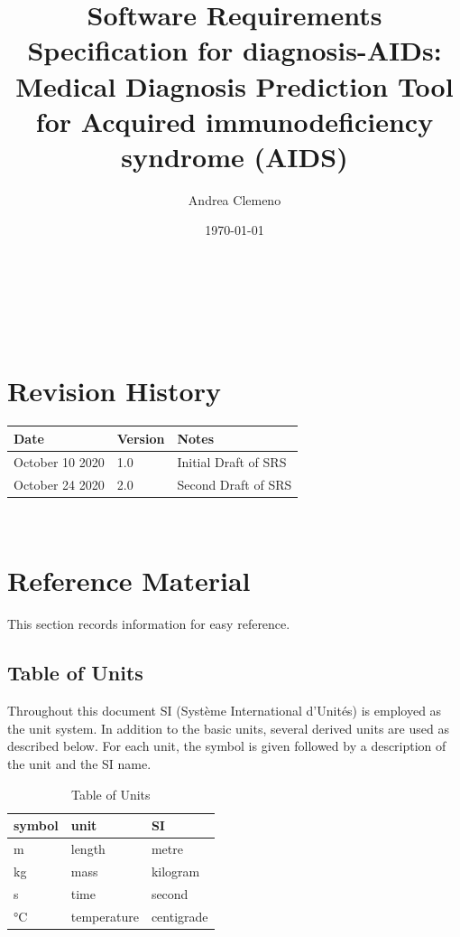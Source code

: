\documentclass[12pt]{article}
\begin{document}
\title{Software Requirements Specification for diagnosis-AIDs\progname: Medical 
Diagnosis Prediction Tool for Acquired immunodeficiency syndrome (AIDS)} 
\author{Andrea Clemeno}
\date{\today}
\maketitle	

~\newpage


\tableofcontents

~\newpage

\section*{Revision History}

\begin{tabularx}{\textwidth}{p{3cm}p{2cm}X}
\toprule {\bf Date} & {\bf Version} & {\bf Notes}\\
\midrule
October 10 2020 & 1.0 & Initial Draft of SRS\\
October 24 2020 & 2.0 & Second Draft of SRS\\
\bottomrule
\end{tabularx}

~\newpage

\section{Reference Material}

This section records information for easy reference.

\subsection{Table of Units}

Throughout this document SI (Syst\`{e}me International d'Unit\'{e}s) is employed
as the unit system.  In addition to the basic units, several derived units are
used as described below.  For each unit, the symbol is given followed by a
description of the unit and the SI name.

\renewcommand{\arraystretch}{1.2}
\begin{table}[ht]
\begin{center}
 \noindent \begin{tabular}{l l l}
    \toprule		
    \textbf{symbol} & \textbf{unit} & \textbf{SI}\\
    \midrule 
    \si{\metre} & length & metre\\
    \si{\kilogram} & mass	& kilogram\\
    \si{\second} & time & second\\
    \si{\celsius} & temperature & centigrade\\
    \bottomrule
  \end{tabular}
  \end{center}
  	\caption{Table of Units}
\end{table}
\end{document}
